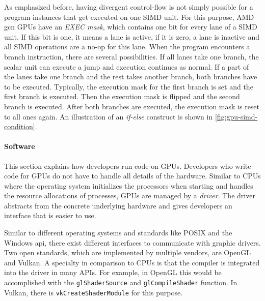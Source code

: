 As emphasized before, having divergent control-flow is not simply possible for a program instances that get executed on one SIMD unit. For this purpose, AMD \gls{gcn} GPUs have an \emph{EXEC mask}, which contains one bit for every lane of a SIMD unit. If this bit is one, it means a lane is active, if it is zero, a lane is inactive and all SIMD operations are a no-op for this lane. When the program encounters a branch instruction, there are several possibilities. If all lanes take one branch, the scalar unit can execute a jump and execution continues as normal. If a part of the lanes take one branch and the rest takes another branch, both branches have to be executed. Typically, the execution mask for the first branch is set and the first branch is executed. Then the execution mask is flipped and the second branch is executed. After both branches are executed, the execution mask is reset to all ones again. An illustration of an \emph{if-else} construct is shown in \cref{fig:gpu-simd-condition}.

\begin{figure}
	\centering
	
\end{figure}

\paragraph{Software} This section explains how developers run code on GPUs. Developers who write code for GPUs do not have to handle all details of the hardware. Similar to CPUs where the operating system initializes the processors when starting and handles the resource allocations of processes, GPUs are managed by a \emph{driver}. The driver abstracts from the concrete underlying hardware and gives developers an interface that is easier to use.

Similar to different operating systems and standards like POSIX and the Windows \gls{api}, there exist different interfaces to communicate with graphic drivers. Two open standards, which are implemented by multiple vendors, are OpenGL and Vulkan. A specialty in comparison to CPUs is that the compiler is integrated into the driver in many APIs.
For example, in OpenGL this would be accomplished with the \texttt{glShaderSource} and \texttt{glCompileShader} function.
In Vulkan, there is \texttt{vkCreateShaderModule} for this purpose.

